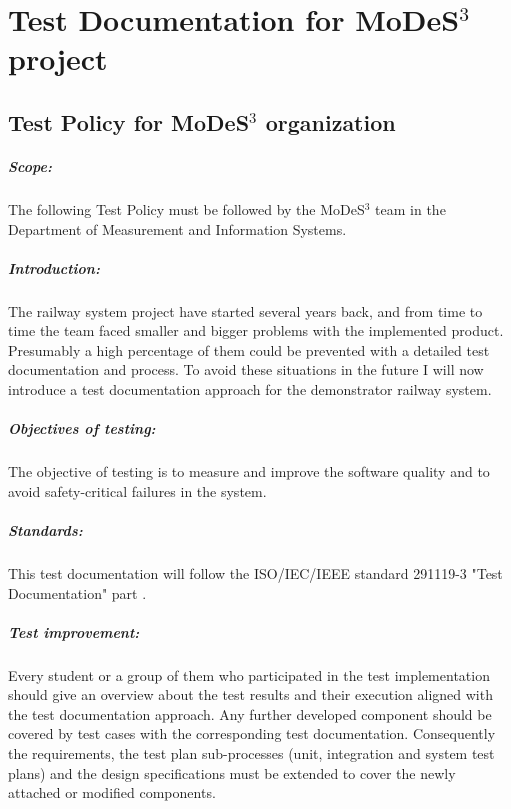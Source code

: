 \chapter{Test Documentation for MoDeS$^3$ project}\label{TestDoc:MODES}

\section{Test Policy for MoDeS$^3$ organization}
\paragraph{Scope:} The following Test Policy must be followed by the MoDeS$^3$ team in the Department of Measurement and Information Systems.
\paragraph{Introduction:} The railway system project have started several years back, and from time to time the team faced smaller and bigger problems with the implemented product. Presumably a high percentage of them could be prevented with a detailed test documentation and process. To avoid these situations in the future I will now introduce a test documentation approach for the demonstrator railway system.
\paragraph{Objectives of testing:} The objective of testing is to measure and improve the software quality and to avoid safety-critical failures in the system.
\paragraph{Standards:} This test documentation will follow the ISO/IEC/IEEE standard 291119-3 "Test Documentation" part \cite{IEEE13}.
\paragraph{Test improvement:} Every student or a group of them who participated in the test implementation should give an overview about the test results and their execution aligned with the test documentation approach. Any further developed component should be covered by test cases with the corresponding test documentation. Consequently the requirements, the test plan sub-processes (unit, integration and system test plans) and the design specifications must be extended to cover the newly attached or modified components.
